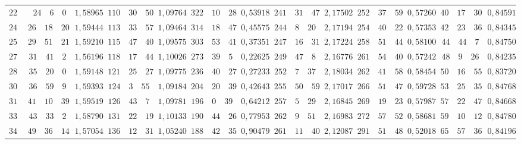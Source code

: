 \begin{landscape}
\begin{center}
\begin{tabular}{r|r|r|r|r|r|r|r|r|r|r|r|r}
\(225\) & \(24\quad 6\quad 0\) & \(1{,}58965\) & \(110\quad 30\quad 50\) & \(1{,}09764\) & \(322\quad 10\quad 28\) & \(0{,}53918\) & \(241\quad 31\quad 47\) & \(2{,}17502\) & \(252\quad 37\quad 59\) & \(0{,}57260\) & \(40\quad 17\quad 30\) & \(0{,}84591\) \\[3pt]
\(240\) & \(26\quad 18\quad 20\) & \(1{,}59444\) & \(113\quad 33\quad 57\) & \(1{,}09464\) & \(314\quad 18\quad 47\) & \(0{,}45575\) & \(244\quad 8\quad 20\) & \(2{,}17194\) & \(254\quad 40\quad 22\) & \(0{,}57353\) & \(42\quad 23\quad 36\) & \(0{,}84345\) \\
\(255\) & \(29\quad 51\quad 21\) & \(1{,}59210\) & \(115\quad 47\quad 40\) & \(1{,}09575\) & \(303\quad 53\quad 41\) & \(0{,}37351\) & \(247\quad 16\quad 31\) & \(2{,}17224\) & \(258\quad 51\quad 44\) & \(0{,}58100\) & \(44\quad 44\quad 7\) & \(0{,}84750\) \\
\(270\) & \(31\quad 41\quad 2\) & \(1{,}56196\) & \(118\quad 17\quad 44\) & \(1{,}10026\) & \(273\quad 39\quad 5\) & \(0{,}22625\) & \(249\quad 47\quad 8\) & \(2{,}16776\) & \(261\quad 54\quad 40\) & \(0{,}57242\) & \(48\quad 9\quad 26\) & \(0{,}84235\) \\
\(285\) & \(35\quad 20\quad 0\) & \(1{,}59148\) & \(121\quad 25\quad 27\) & \(1{,}09775\) & \(236\quad 40\quad 27\) & \(0{,}27233\) & \(252\quad 7\quad 37\) & \(2{,}18034\) & \(262\quad 41\quad 58\) & \(0{,}58454\) & \(50\quad 16\quad 55\) & \(0{,}83720\) \\[3pt]
\(300\) & \(36\quad 59\quad 9\) & \(1{,}59393\) & \(124\quad 3\quad 55\) & \(1{,}09184\) & \(204\quad 20\quad 39\) & \(0{,}42643\) & \(255\quad 50\quad 59\) & \(2{,}17017\) & \(266\quad 51\quad 47\) & \(0{,}59728\) & \(53\quad 25\quad 35\) & \(0{,}84768\) \\
\(315\) & \(41\quad 10\quad 39\) & \(1{,}59519\) & \(126\quad 43\quad 7\) & \(1{,}09781\) & \(196\quad 0\quad 39\) & \(0{,}64212\) & \(257\quad 5\quad 29\) & \(2{,}16845\) & \(269\quad 19\quad 23\) & \(0{,}57987\) & \(57\quad 22\quad 47\) & \(0{,}84668\) \\
\(330\) & \(43\quad 33\quad 2\) & \(1{,}58790\) & \(131\quad 22\quad 19\) & \(1{,}10133\) & \(190\quad 44\quad 26\) & \(0{,}77953\) & \(262\quad 9\quad 51\) & \(2{,}16983\) & \(272\quad 57\quad 52\) & \(0{,}58681\) & \(59\quad 10\quad 12\) & \(0{,}84780\) \\
\(345\) & \(49\quad 36\quad 14\) & \(1{,}57054\) & \(136\quad 12\quad 31\) & \(1{,}05240\) & \(188\quad 42\quad 35\) & \(0{,}90479\) & \(261\quad 11\quad 40\) & \(2{,}12087\) & \(291\quad 51\quad 48\) & \(0{,}52018\) & \(65\quad 57\quad 36\) & \(0{,}84196\) \\

\end{tabular}
\end{center}
\end{landscape}
